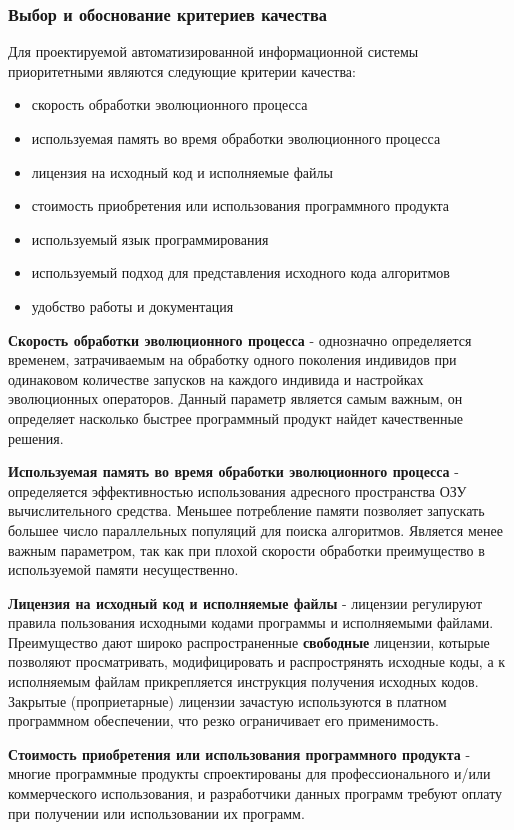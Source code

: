 \documentclass[russian,utf8,emptystyle]{eskdtext}
\begin{document}
\subsubsection{Выбор и обоснование критериев качества}
Для проектируемой автоматизированной информационной системы приоритетными являются следующие критерии качества:
\begin{itemize}
\item скорость обработки эволюционного процесса
\item используемая память во время обработки эволюционного процесса
\item лицензия на исходный код и исполняемые файлы
\item стоимость приобретения или использования программного продукта
\item используемый язык программирования
\item используемый подход для представления исходного кода алгоритмов
\item удобство работы и документация
\end{itemize}

\textbf{Скорость обработки эволюционного процесса} - однозначно определяется временем, затрачиваемым на обработку одного поколения индивидов при одинаковом количестве запусков на каждого индивида и настройках эволюционных операторов. Данный параметр является самым важным, он определяет насколько быстрее программный продукт найдет качественные решения.

\textbf{Используемая память во время обработки эволюционного процесса} - определяется эффективностью использования адресного пространства ОЗУ вычислительного средства. Меньшее потребление памяти позволяет запускать большее число параллельных популяций для поиска алгоритмов. Является менее важным параметром, так как при плохой скорости обработки преимущество в используемой памяти несущественно.

\textbf{Лицензия на исходный код и исполняемые файлы} - лицензии регулируют правила пользования исходными кодами программы и исполняемыми файлами. Преимущество дают широко распространенные \textbf{свободные} лицензии, котырые позволяют просматривать, модифицировать и распрострянять исходные коды, а к исполняемым файлам прикрепляется инструкция получения исходных кодов. Закрытые (проприетарные) лицензии зачастую используются в платном программном обеспечении, что резко ограничивает его применимость.

\textbf{Стоимость приобретения или использования программного продукта} - многие программные продукты спроектированы для профессионального и/или коммерческого использования, и разработчики данных программ требуют оплату при получении или использовании их программ.
\end{document}
